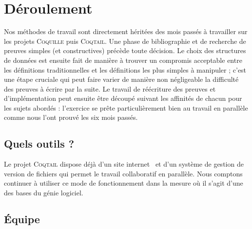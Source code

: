 \documentclass[11pt]{article}
\newcommand{\coqtail}{\textsc{Coqtail}}
\newcommand{\coquille}{\textsc{Coquille}}
\begin{document}
\section{Déroulement}

Nos méthodes de travail sont directement héritées des mois passés à travailler sur les projets \coquille{} puis \coqtail{}. Une phase de bibliographie et de recherche de preuves simples (et constructives) précède toute décision. Le choix des structures de données est ensuite fait de manière à trouver un compromis acceptable entre les définitions traditionnelles et les définitions les plus simples à manipuler ; c'est une étape cruciale qui peut faire varier de manière non négligeable la difficulté des preuves à écrire par la suite. Le travail de réécriture des preuves et d'implémentation peut ensuite être découpé suivant les affinités de chacun pour les sujets abordés : l'exercice se prête particulièrement bien au travail en parallèle comme nous l'ont prouvé les six mois passés.

\subsection{Quels outils ?}

Le projet \coqtail{} dispose déjà d'un site internet~\cite{coqtail} et d'un système de gestion de version de fichiers qui permet le travail collaboratif en parallèle. Nous comptons continuer à utiliser ce mode de fonctionnement dans la mesure où il s'agit d'une des bases du génie logiciel. 





\subsection{Équipe}
\end{document}

